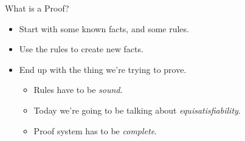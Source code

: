 \documentclass{beamer}
\begin{document}
\begin{frame}{What is a Proof?}
    \begin{itemize}
        \item Start with some known facts, and some rules.
        \item Use the rules to create new facts.
        \item End up with the thing we're trying to prove.
            \begin{itemize}
                \item Rules have to be \emph{sound}.
                \item Today we're going to be talking about \emph{equisatisfiability}.
                \item Proof system has to be \emph{complete}.
            \end{itemize}
    \end{itemize}
\end{frame}
\end{document}
